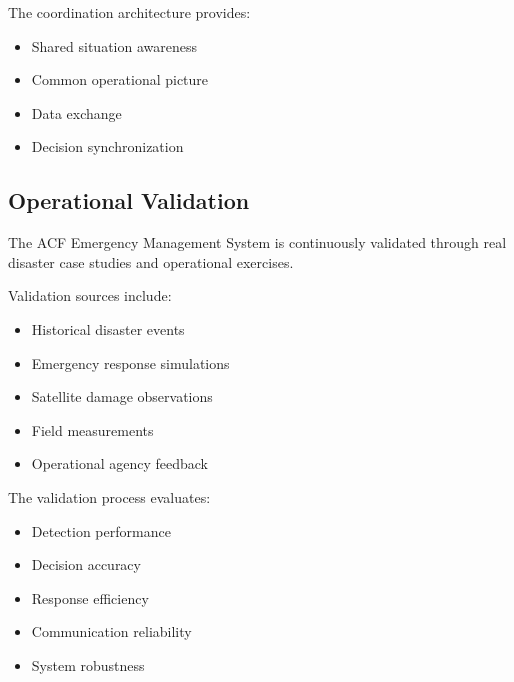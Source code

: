 The coordination architecture provides:

\begin{itemize}

\item Shared situation awareness

\item Common operational picture

\item Data exchange

\item Decision synchronization

\end{itemize}


\subsection{Operational Validation}

The ACF Emergency Management System is continuously validated through
real disaster case studies and operational exercises.

Validation sources include:

\begin{itemize}

\item Historical disaster events

\item Emergency response simulations

\item Satellite damage observations

\item Field measurements

\item Operational agency feedback

\end{itemize}


The validation process evaluates:

\begin{itemize}

\item Detection performance

\item Decision accuracy

\item Response efficiency

\item Communication reliability

\item System robustness

\end{itemize}


